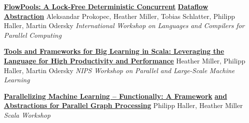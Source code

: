 \documentclass[9pt]{article}
\begin{document}
\noindent\href{http://infoscience.epfl.ch/record/180265}{\bf FlowPools: A Lock-Free Deterministic Concurrent}\vspace{-0.03in}
\newline\noindent\href{http://infoscience.epfl.ch/record/180265}{\bf Dataflow Abstraction}
\newline\noindent Aleksandar Prokopec, Heather Miller, Tobias Schlatter,
\newline\noindent Philipp Haller, Martin Odersky
\newline\noindent\emph{International Workshop on Languages and Compilers for Parallel Computing}
\vspace{0.03in}
\newline{}
\vspace{-0.03in}
\newline{}
\vspace{-0.03in}
\newline{}
\bigskip

\noindent\href{http://infoscience.epfl.ch/record/170032}{\bf Tools and Frameworks for Big Learning in Scala: Leveraging the}\vspace{-0.03in}
\newline\noindent\href{http://infoscience.epfl.ch/record/170032}{\bf Language for High Productivity and Performance}
\newline\noindent Heather Miller, Philipp Haller, Martin Odersky
\newline\noindent\emph{NIPS Workshop on Parallel and Large-Scale Machine Learning}
\bigskip

\noindent\href{http://infoscience.epfl.ch/record/165111}{\bf Parallelizing Machine Learning -- Functionally: A Framework}\vspace{-0.03in}
\newline\noindent\href{http://infoscience.epfl.ch/record/165111}{\bf and Abstractions for Parallel Graph Processing}
\newline\noindent Philipp Haller, Heather Miller
\newline\noindent\emph{Scala Workshop}
\bigskip

\end{document}
